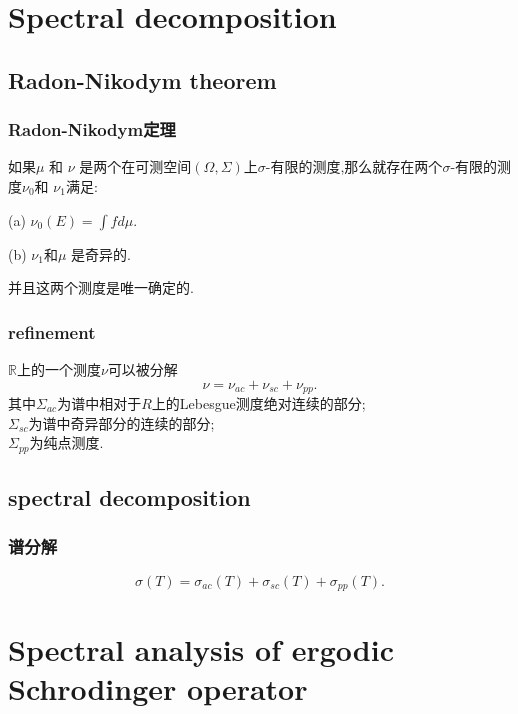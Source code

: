 \documentclass[compress,mathserif,red]{beamer}
\begin{document}
\section{Spectral decomposition} %
\subsection{Radon-Nikodym theorem} %
\begin{frame}
\frametitle{Radon-Nikodym定理}
\begin{definition}
如果$\mu$ 和 $\nu$ 是两个在可测空间$(\Omega,\Sigma)$上$\sigma$-有限的测度,那么就存在两个$\sigma$-有限的测度$\nu_0$和
$\nu_1$满足:

 (a) $\nu_0(E)=\int f d\mu.$

 (b) $\nu_1$和$\mu$ 是奇异的.

并且这两个测度是唯一确定的.
\end{definition}
\end{frame}


\begin{frame}
\frametitle{refinement}
\begin{corollary}
$\mathbb{R}$上的一个测度$\nu$可以被分解
$$\nu=\nu_{ac}+\nu_{sc}+\nu_{pp}.$$
其中$\Sigma_{ac}$为谱中相对于$R$上的Lebesgue测度绝对连续的部分;\\
$\Sigma_{sc}$为谱中奇异部分的连续的部分;\\
$\Sigma_{pp}$为纯点测度.
\end{corollary}
\end{frame}



\subsection{spectral decomposition}
\begin{frame}
\frametitle{谱分解}
\begin{theorem}
$$\sigma(T)=\sigma_{ac}(T)+\sigma_{sc}(T)+\sigma_{pp}(T).$$
\end{theorem}
\end{frame}


\section{Spectral analysis of ergodic Schrodinger operator} %
\end{document}
